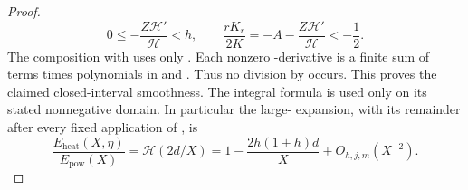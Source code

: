 \begin{proof}
\[
 0\leq-\frac{Z\mathcal H'}{\mathcal H}<h,
 \qquad
 \frac{rK_r}{2K}=-A-\frac{Z\mathcal H'}{\mathcal H}<-\frac12.
\]
The composition with  uses only
. Each nonzero -derivative is a finite
sum of terms  times polynomials in
 and . Thus no division by
 occurs. This proves the claimed closed-interval smoothness. The
integral formula is used only on its stated nonnegative domain. In particular the large-
 expansion, with its remainder after every fixed application of
, is
\begin{equation}
 \frac{E_{\mathrm{heat}}(X,\eta)}{E_{\mathrm{pow}}(X)}
 =\mathcal H(2d/X)=1-\frac{2h(1+h)d}{X}+O_{h,j,m}(X^{-2}).
 \tag{A.38}\label{eq:A.38}
\end{equation}
\end{proof}

